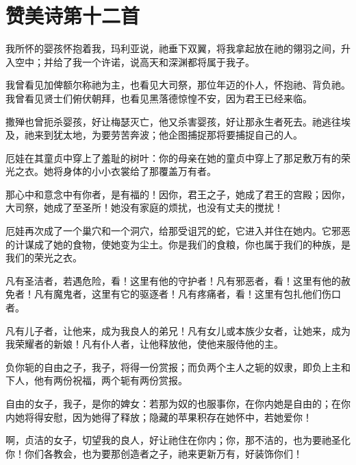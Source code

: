 
\section{赞美诗第十二首}

我所怀的婴孩怀抱着我，玛利亚说，祂垂下双翼，将我拿起放在祂的翎羽之间，升入空中；并给了我一个许诺，说高天和深渊都将属于我子。\par

我曾看见加俾额尔称祂为主，也看见大司祭，那位年迈的仆人，怀抱祂、背负祂。我曾看见贤士们俯伏朝拜，也看见黑落德惊惶不安，因为君王已经来临。\par

撒殚也曾扼杀婴孩，好让梅瑟灭亡，他又杀害婴孩，好让那永生者死去。祂逃往埃及，祂来到犹太地，为要劳苦奔波；他企图捕捉那将要捕捉自己的人。\par

厄娃在其童贞中穿上了羞耻的树叶：你的母亲在她的童贞中穿上了那足敷万有的荣光之衣。她将身体的小小衣裳给了那覆盖万有者。\par

那心中和意念中有你者，是有福的！因你，君王之子，她成了君王的宫殿；因你，大司祭，她成了至圣所！她没有家庭的烦扰，也没有丈夫的搅扰！\par

厄娃再次成了一个巢穴和一个洞穴，给那受诅咒的蛇，它进入并住在她内。它邪恶的计谋成了她的食物，使她变为尘土。你是我们的食粮，你也属于我们的种族，是我们的荣光之衣。\par

凡有圣洁者，若遇危险，看！这里有他的守护者！凡有邪恶者，看！这里有他的赦免者！凡有魔鬼者，这里有它的驱逐者！凡有疼痛者，看！这里有包扎他们伤口者。\par

凡有儿子者，让他来，成为我良人的弟兄！凡有女儿或本族少女者，让她来，成为我荣耀者的新娘！凡有仆人者，让他释放他，使他来服侍他的主。\par

负你轭的自由之子，我子，将得一份赏报；而负两个主人之轭的奴隶，即负上主和下人，他有两份祝福，两个轭有两份赏报。\par

自由的女子，我子，是你的婢女：若那为奴的也服事你，在你内她是自由的；在你内她将得安慰，因为她得了释放；隐藏的苹果积存在她怀中，若她爱你！\par

啊，贞洁的女子，切望我的良人，好让祂住在你内；你，那不洁的，也为要祂圣化你！你们各教会，也为要那创造者之子，祂来更新万有，好装饰你们！\par

